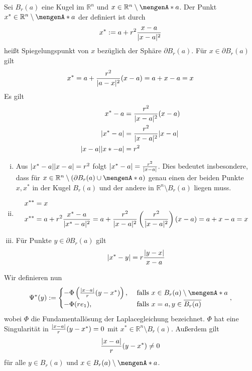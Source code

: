 
\begin{definition}
	Sei $B_r(a)$ eine Kugel im $\mathbb{R}^n$ und $x \in \mathbb{R}^n \setminus \set{a}$. Der Punkt $x^* \in \mathbb{R}^n \setminus \set{a}$ der definiert ist durch
	\[
		x^* := a + r^2 \frac{x-a}{\lvert x-a\rvert^2}
	\]
	heißt Spiegelungspunkt von $x$ bezüglich der Sphäre $ \partial B_r(a)$.
	Für $x \in \partial B_r(a)$ gilt
	\[
		x^* = a + \frac{r^2}{\lvert a-x\rvert^2}(x-a) = a + x -a = x
	\]
	Es gilt
	\begin{align*}
		x^*-a &= \frac{r^2}{\lvert x-a\rvert^2}(x-a) \\
		\lvert x^*-a\rvert &= \frac{r^2}{\lvert x-a\rvert^2}\lvert x-a\rvert \\
		\lvert x-a\rvert\lvert x*-a\rvert &= r^2
	\end{align*}
\end{definition}
\begin{bemerkung}
	\begin{enumerate}[(i)]
		\item Aus $\lvert x^*-a\rvert \lvert x-a\rvert = r^2$ folgt $\lvert x^* -a \rvert = \frac{r^2}{\lvert x-a\rvert}$. 
		Dies bedeutet insbesondere, dass für $x \in  \mathbb{R}^n \setminus \left( \partial B_r(a) \cup \set{a} \right)$ genau einen der beiden Punkte $x,x^*$ 
		in der Kugel $B_r(a)$ und der andere in $\mathbb{R}^n \setminus B_r(a)$ liegen muss.
		\item \begin{align*}
			x^{**} &= x \\
			x^{**} &= a + r^2 \frac{x^* - a}{\lvert x^*-a\rvert^2} = a + \frac{r^2}{\lvert x-a\rvert^2}\left( \frac{r^2}{\lvert x-a\rvert^2} \right)(x-a) = a + x-a =x
		\end{align*}
		\item Für Punkte $y \in \partial B_r(a)$ gilt
		\[
			\lvert x^*-y\rvert = r \frac{\lvert y-x\rvert}{x-a}
		\]
	\end{enumerate}
\end{bemerkung}
Wir definieren nun 
\[
	\Psi^*(y):= \begin{cases}
		- \Phi \left( \frac{\abs{x-a}}{r}(y-x^*) \right), &\text{ falls } x \in B_r(a) \setminus \set{a} \\
		- \Phi (r e_1) , &\text{ falls } x = a, y \in \overline{B_r(a)}
	\end{cases},
\]
wobei $\Phi$ die Fundamentallösung der Laplacegleichung bezeichnet. 
$\Phi$ hat eine Singularität in $ \frac{\lvert x-a\rvert}{r} (y - x^*)= 0$ mit $x^* \in \mathbb{R}^n \setminus B_r(a)$. Außerdem gilt
\[
	\frac{\lvert x-a\rvert}{r}(y- x^*) \neq 0
\]
für alle $y \in B_r(a)$ und $x \in B_r(a) \setminus \set{a}$. \\
